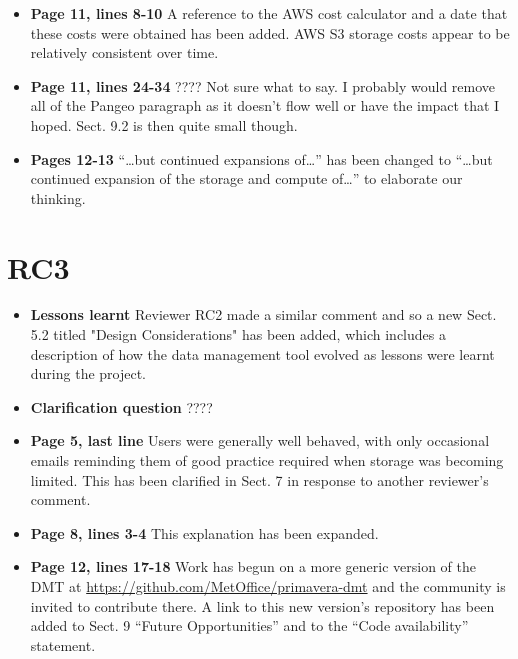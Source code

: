 \documentclass[12pt,a4paper]{article}
\begin{document}
\begin{itemize}
\item \textbf{Page 11, lines 8-10} A reference to the AWS cost calculator and a date that these costs were obtained has been added. AWS S3 storage costs appear to be relatively consistent over time.

\item \textbf{Page 11, lines 24-34} ???? Not sure what to say. I probably would remove all of the Pangeo paragraph as it doesn't flow well or have the impact that I hoped. Sect. 9.2 is then quite small though.

\item \textbf{Pages 12-13} ``\ldots but continued expansions of\ldots'' has been changed to ``\ldots but continued expansion of the storage and compute of\dots'' to elaborate our thinking.

\end{itemize}

\section{RC3}

\begin{itemize}
\item \textbf{Lessons learnt} Reviewer RC2 made a similar comment and so a new Sect. 5.2 titled "Design Considerations" has been added, which includes a description of how the data management tool evolved as lessons were learnt during the project.

\item \textbf{Clarification question} ????

\item \textbf{Page 5, last line} Users were generally well behaved, with only occasional emails reminding them of good practice required when storage was becoming limited. This has been clarified in Sect. 7 in response to another reviewer's comment.

\item \textbf{Page 8, lines 3-4} This explanation has been expanded.

\item \textbf{Page 12, lines 17-18} Work has begun on a more generic version of the DMT at \url{https://github.com/MetOffice/primavera-dmt} and the community is invited to contribute there. A link to this new version's repository has been added to Sect. 9 ``Future Opportunities'' and to the ``Code availability'' statement.

\end{itemize}
\end{document}

